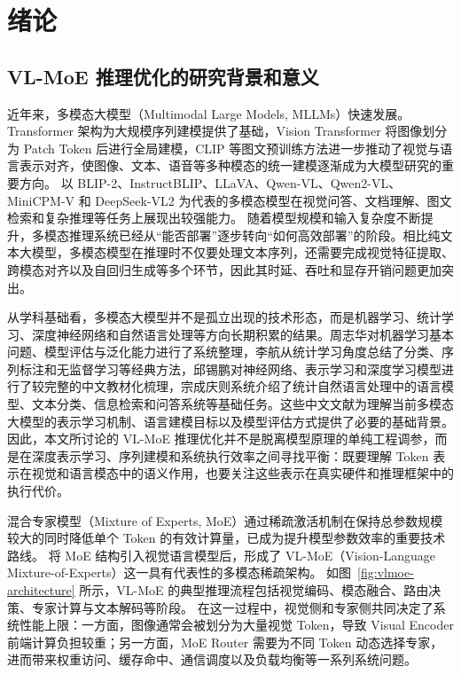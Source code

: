 \chapter{绪论}
\label{cha:intro}

\section{VL-MoE 推理优化的研究背景和意义}
近年来，多模态大模型（Multimodal Large Models, MLLMs）快速发展。Transformer 架构为大规模序列建模提供了基础\cite{vaswani2017attention}，Vision Transformer 将图像划分为 Patch Token 后进行全局建模\cite{dosovitskiy2021vit}，CLIP 等图文预训练方法进一步推动了视觉与语言表示对齐\cite{radford2021clip}，使图像、文本、语音等多种模态的统一建模逐渐成为大模型研究的重要方向。
以 BLIP-2、InstructBLIP、LLaVA、Qwen-VL、Qwen2-VL、MiniCPM-V 和 DeepSeek-VL2 为代表的多模态模型在视觉问答、文档理解、图文检索和复杂推理等任务上展现出较强能力\cite{li2023blip2,dai2023instructblip,liu2023llava,bai2023qwenvl,wang2024qwen2vl,yao2024minicpmv,wu2024deepseekvl2}。
随着模型规模和输入复杂度不断提升，多模态推理系统已经从“能否部署”逐步转向“如何高效部署”的阶段。相比纯文本大模型，多模态模型在推理时不仅要处理文本序列，还需要完成视觉特征提取、跨模态对齐以及自回归生成等多个环节，因此其时延、吞吐和显存开销问题更加突出。

从学科基础看，多模态大模型并不是孤立出现的技术形态，而是机器学习、统计学习、深度神经网络和自然语言处理等方向长期积累的结果。周志华对机器学习基本问题、模型评估与泛化能力进行了系统整理\cite{zhou2016machinelearning}，李航从统计学习角度总结了分类、序列标注和无监督学习等经典方法\cite{li2019statisticallearning}，邱锡鹏对神经网络、表示学习和深度学习模型进行了较完整的中文教材化梳理\cite{qiu2020deeplearning}，宗成庆则系统介绍了统计自然语言处理中的语言模型、文本分类、信息检索和问答系统等基础任务\cite{zong2013snlp}。这些中文文献为理解当前多模态大模型的表示学习机制、语言建模目标以及模型评估方式提供了必要的基础背景。
因此，本文所讨论的 VL-MoE 推理优化并不是脱离模型原理的单纯工程调参，而是在深度表示学习、序列建模和系统执行效率之间寻找平衡：既要理解 Token 表示在视觉和语言模态中的语义作用，也要关注这些表示在真实硬件和推理框架中的执行代价。

混合专家模型（Mixture of Experts, MoE）通过稀疏激活机制在保持总参数规模较大的同时降低单个 Token 的有效计算量，已成为提升模型参数效率的重要技术路线\cite{shazeer2017moe,lepikhin2021gshard,fedus2022switch,du2022glam}。
将 MoE 结构引入视觉语言模型后，形成了 VL-MoE（Vision-Language Mixture-of-Experts）这一具有代表性的多模态稀疏架构\cite{lin2024moellava}。
如图~\ref{fig:vlmoe-architecture} 所示，VL-MoE 的典型推理流程包括视觉编码、模态融合、路由决策、专家计算与文本解码等阶段。
在这一过程中，视觉侧和专家侧共同决定了系统性能上限：一方面，图像通常会被划分为大量视觉 Token，导致 Visual Encoder 前端计算负担较重；另一方面，MoE Router 需要为不同 Token 动态选择专家，进而带来权重访问、缓存命中、通信调度以及负载均衡等一系列系统问题。

